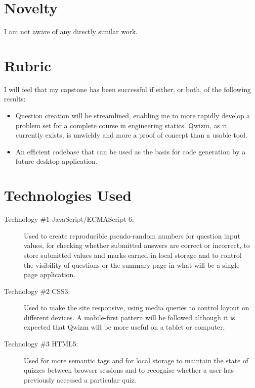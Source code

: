 \documentclass{tufte-handout}
\begin{document}
\section{\Large Novelty}
I am not aware of any directly similar work.

\section{\Large Rubric}
I will feel that my capstone has been successful if either, or both, of the following results:
\begin{itemize}
	\item Question creation will be streamlined, enabling me to more rapidly develop a problem set for a complete course in engineering statics. Qwizm, as it currently exists, is unwieldy and more a proof of concept than a usable tool.
	\item An efficient codebase that can be used as the basis for code generation by a future desktop application.
\end{itemize}

\section{\Large Technologies Used}
\begin{description}
	\item[Technology \#1 JavaScript/ECMAScript 6:] Used to create reproducible pseudo-random numbers for question input values, for checking whether submitted answers are correct or incorrect, to store submitted values and marks earned in local storage and to control the visibility of questions or the summary page in what will be a single page application.
	\item[Technology \#2 CSS3:] Used to make the site responsive, using media queries to control layout on different devices. A mobile-first pattern will be followed although it is expected that Qwizm will be more useful on a tablet or computer.
	\item[Technology \#3 HTML5:] Used for more semantic tags and for local storage to maintain the state of quizzes between browser sessions and to recognise whether a user has previously accessed a particular quiz.
\end{description}
\end{document}
